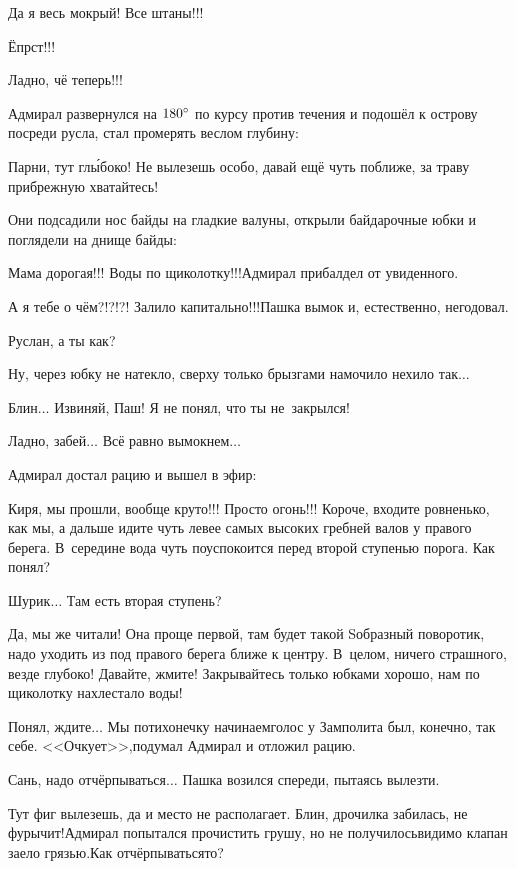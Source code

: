 \diagdash Да я весь мокрый! Все штаны!!!

\diagdash Ёпрст!!!

\diagdash Ладно, чё теперь!!!

Адмирал развернулся на $180\degree$ по курсу против течения и подошёл к острову посреди русла, стал промерять веслом глубину:

\diagdash Парни, тут гл{\'ы}боко! Не вылезешь особо, давай ещё чуть поближе, за траву прибрежную хватайтесь!

Они подсадили нос байды на гладкие валуны, открыли байдарочные юбки и поглядели на днище байды:

\diagdash Мама дорогая!!! Воды по щиколотку!!!\mdash Адмирал прибалдел от увиденного.

\diagdash А я тебе о чём?!?!?! Залило капитально!!!\mdash Пашка вымок и, естественно, негодовал.
 
\diagdash Руслан, а ты как?

\diagdash Ну, через юбку не натекло, сверху только брызгами намочило нехило так$\ldots$

\diagdash Блин$\ldots$ Извиняй, Паш! Я не понял, что ты не~закрылся!

\diagdash Ладно, забей$\ldots$ Всё равно вымокнем$\ldots$

Адмирал достал рацию и вышел в эфир:

\diagdash Киря, мы прошли, вообще круто!!! Просто огонь!!! Короче, входите ровненько, как мы, а дальше идите чуть левее самых высоких гребней валов у правого берега. В~середине вода чуть поуспокоится перед второй ступенью порога. Как понял?

\diagdash Шурик$\ldots$ Там есть вторая ступень?

\diagdash Да, мы же читали! Она проще первой, там будет такой S\sdash образный поворотик, надо уходить из под правого берега ближе к центру. В~целом, ничего страшного, везде глубоко! Давайте, жмите! Закрывайтесь только юбками хорошо, нам по щиколотку нахлестало воды!

\diagdash Понял, ждите$\ldots$ Мы потихонечку начинаем\mdash голос у Замполита был, конечно, так себе. <<Очкует>>,\mdash подумал Адмирал и отложил рацию.

\diagdash Сань, надо отчёрпываться$\ldots$ \mdash Пашка возился спереди, пытаясь вылезти.

\diagdash Тут фиг вылезешь, да и место не располагает. Блин, дрочилка забилась, не фурычит!\mdash Адмирал попытался прочистить грушу, но не получилось\mdash видимо клапан заело грязью.\mdash Как отчёрпываться\sdash то?

